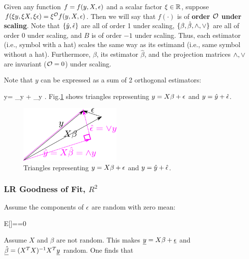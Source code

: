 Given any function $f=f(y,X,\epsilon)$
and a scalar factor $\xi\in { \mathbb{R}}$,
suppose 
$f(\xi y, \xi X, \xi\epsilon)=\xi^{\cal O} f(y,X,\epsilon)$.
Then we will say that $f(\cdot)$
is of {\bf order ${\cal O}$ under scaling}.
Note that $\{\hat{y},
 \hat{\epsilon}\}$
are all of order 1 under scaling,
$\{\beta, \hat{\beta}, \wedge, \vee\}$
are all of order 0 under scaling,
and $B$ is of order $-1$ under scaling.
Thus, each estimator (i.e., symbol
with a hat) 
scales the same way as its estimand (i.e., same
symbol
without a hat). Furthermore,
$\beta$, its estimator $\hat{\beta}$, and
the projection matrices $\wedge, \vee$
are invariant (${\cal O}=0$) under scaling.



Note that $y$ 
can be expressed as
a sum of 2 orthogonal estimators:
 


\beq
y= _{\A y} + 
\underbrace{\hat{\eps}}_{\V y}
\;.
\eeq
Fig.\ref{fig-lin-reg-vecs}
shows triangles representing 
$y=X\beta+\epsilon$ and $y=\hat{y}+\hat{\epsilon}$.


\begin{figure}[h!]
\centering
\includegraphics[width=2in]
{conventions/lin-reg-vecs.png}
\caption{Triangles
representing
$y=X\beta+\epsilon$ and $y=\hat{y}+\hat{\epsilon}$.} 
\label{fig-lin-reg-vecs}
\end{figure}

\subsubsection{LR Goodness of Fit, $R^2$}


Assume the components of $\epsilon$ 
are random with zero mean:

\beq
E[\rveps]=\av{\rveps}=0
\eeq



Assume $X$ and $\beta$ are not random.
This makes ${\underline{y}}=X\beta +\underline{\epsilon}$ and $\underline{\hat{\beta}}=
(X^TX)^{-1}X^T{\underline{y}}
$
random.
One finds that


